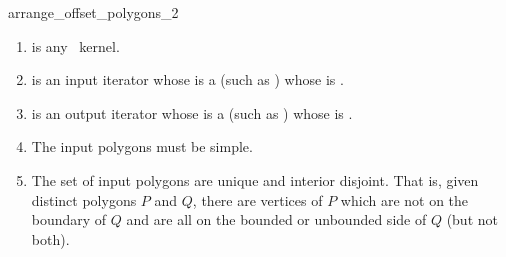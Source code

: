 \begin{ccRefFunction}{arrange_offset_polygons_2}
\begin{enumerate} 
   \item    {} is any \cgal\ kernel.
   \item    {} is an input iterator whose  is a 
            (such as ) whose  is .
   \item    {} is an output iterator whose  is a 
            (such as ) whose  is .
   \item    The input polygons must be simple.
   \item    The set of input polygons are unique and interior disjoint. That is, given distinct polygons
            $P$ and $Q$, there are vertices of $P$ which are not on the boundary of $Q$ and are all on the
            bounded or unbounded side of $Q$ (but not both). 
\end{enumerate}


\ccSeeAlso
{}\\
 \\

\end{ccRefFunction}


